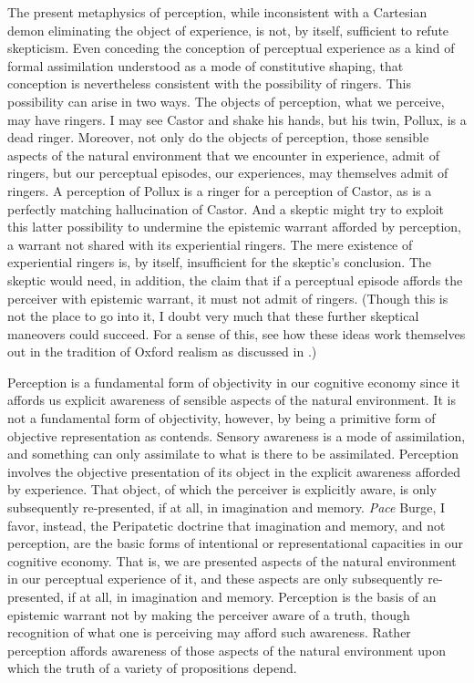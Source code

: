 The present metaphysics of perception, while inconsistent with a Cartesian demon eliminating the object of experience, is not, by itself, sufficient to refute skepticism. Even conceding the conception of perceptual experience as a kind of formal assimilation understood as a mode of constitutive shaping, that conception is nevertheless consistent with the possibility of ringers. This possibility can arise in two ways. The objects of perception, what we perceive, may have ringers. I may see Castor and shake his hands, but his twin, Pollux, is a dead ringer. Moreover, not only do the objects of perception, those sensible aspects of the natural environment that we encounter in experience, admit of ringers, but our perceptual episodes, our experiences, may themselves admit of ringers. A perception of Pollux is a ringer for a perception of Castor, as is a perfectly matching hallucination of Castor. And a skeptic might try to exploit this latter possibility to undermine the epistemic warrant afforded by perception, a warrant not shared with its experiential ringers. The mere existence of experiential ringers is, by itself, insufficient for the skeptic's conclusion. The skeptic would need, in addition, the claim that if a perceptual episode affords the perceiver with epistemic warrant, it must not admit of ringers. (Though this is not the place to go into it, I doubt very much that these further skeptical maneovers could succeed. For a sense of this, see how these ideas work themselves out in the tradition of Oxford realism as discussed in \citealt{Kalderon:2010fk}.)

Perception is a fundamental form of objectivity in our cognitive economy since it affords us explicit awareness of sensible aspects of the natural environment. It is not a fundamental form of objectivity, however, by being a primitive form of objective representation as \cite{Burge:2010uq} contends. Sensory awareness is a mode of assimilation, and something can only assimilate to what is there to be assimilated. Perception involves the objective presentation of its object in the explicit awareness afforded by experience. That object, of which the perceiver is explicitly aware, is only subsequently re-presented, if at all, in imagination and memory. \emph{Pace} Burge, I favor, instead, the Peripatetic doctrine that imagination and memory, and not perception, are the basic forms of intentional or representational capacities in our cognitive economy. That is, we are presented aspects of the natural environment in our perceptual experience of it, and these aspects are only subsequently re-presented, if at all, in imagination and memory. Perception is the basis of an epistemic warrant not by making the perceiver aware of a truth, though recognition of what one is perceiving may afford such awareness. Rather perception affords awareness of those aspects of the natural environment upon which the truth of a variety of propositions depend.

